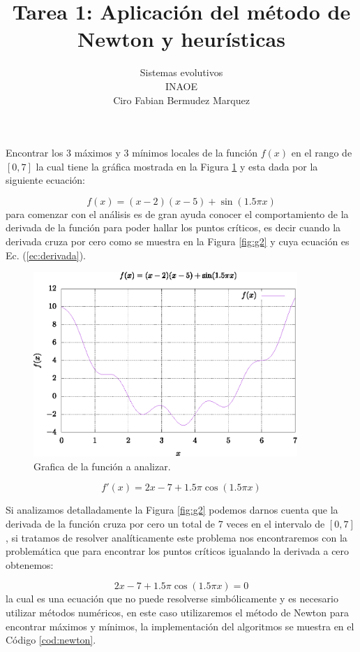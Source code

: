 \documentclass[10pt,a4paper]{article}
\author{Sistemas evolutivos\\INAOE\\Ciro Fabian Bermudez Marquez}
\title{Tarea 1: Aplicación del método de Newton y heurísticas}
\begin{document}
\maketitle

Encontrar los 3 máximos y 3 mínimos locales de la función $f(x)$ en el rango de $[0,7]$ la cual tiene la gráfica mostrada en la Figura \ref{fig:g1} y esta dada por la siguiente ecuación:

\begin{equation}
f(x) = (x-2)(x-5) + \sin(1.5 \pi x)
\end{equation}
para comenzar con el análisis es de gran ayuda conocer el comportamiento de la derivada de la función para poder hallar los puntos críticos, es decir cuando la derivada cruza por cero como se muestra en la Figura \ref{fig:g2} y cuya ecuación es Ec. (\ref{ec:derivada}). 

\begin{figure}[hbtp]
\centering
\includegraphics[width=10cm]{grafica1.eps}
\caption{Grafica de la función a analizar.}
\label{fig:g1}
\end{figure}

\begin{equation}
f'(x) = 2x -7 + 1.5 \pi \cos(1.5 \pi x)
\label{ec:derivada}
\end{equation}

Si analizamos detalladamente la  Figura \ref{fig:g2} podemos darnos cuenta que la derivada de la función cruza por cero un total de 7 veces en el intervalo de $[0,7]$, si tratamos de resolver analíticamente este problema nos encontraremos con la problemática que para encontrar los puntos críticos igualando la derivada a cero obtenemos:

\begin{equation}
 2x -7 + 1.5 \pi \cos(1.5 \pi x) = 0
\end{equation} 
la cual es una ecuación que no puede resolverse simbólicamente y es necesario utilizar métodos numéricos, en este caso utilizaremos el método de Newton para encontrar máximos y mínimos, la implementación del algoritmos se muestra en el Código \ref{cod:newton}.
\end{document}
